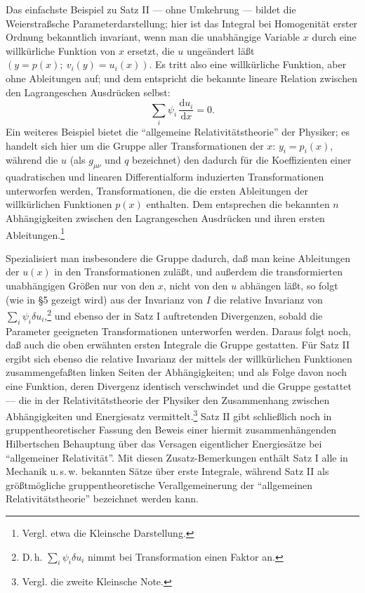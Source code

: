 \documentclass[11pt]{article}
\newcommand{\dd}{\mathrm d}
\begin{document}
Das einfachste Beispiel zu Satz II --- ohne Umkehrung --- bildet die Weierstraßsche Parameterdarstellung; hier ist das Integral bei Homogenität erster Ordnung bekanntlich invariant, wenn man die unabhängige Variable \(x\) durch eine willkürliche Funktion von \(x\) ersetzt, die \(u\) ungeändert läßt \((y=p(x);\ v_i(y)=u_i(x))\). Es tritt also eine willkürliche Funktion, aber ohne Ableitungen auf; und dem entspricht die bekannte lineare Relation zwischen den Lagrangeschen Ausdrücken selbst:
\[
\sum_i \psi_i\,\frac{\dd u_i}{\dd x}=0.
\]
Ein weiteres Beispiel bietet die ``allgemeine Relativitätstheorie'' der Physiker; es handelt sich hier um die Gruppe aller Transformationen der \(x\): \(y_i=p_i(x)\), während die \(u\) (als \(g_{\mu\nu}\) und \(q\) bezeichnet) den dadurch für die Koeffizienten einer quadratischen und linearen Differentialform induzierten Transformationen unterworfen werden, Transformationen, die die ersten Ableitungen der willkürlichen Funktionen \(p(x)\) enthalten. Dem entsprechen die bekannten \(n\) Abhängigkeiten zwischen den Lagrangeschen Ausdrücken und ihren ersten Ableitungen.\footnote{Vergl. etwa die Kleinsche Darstellung.}

Spezialisiert man insbesondere die Gruppe dadurch, daß man keine Ableitungen der \(u(x)\) in den Transformationen zuläßt, und außerdem die transformierten unabhängigen Größen nur von den \(x\), nicht von den \(u\) abhängen läßt, so folgt (wie in \S{}5 gezeigt wird) aus der Invarianz von \(I\) die relative Invarianz von \(\sum_i\psi_i\delta u_i\),\footnote{D.\,h. \(\sum_i\psi_i\delta u_i\) nimmt bei Transformation einen Faktor an.} und ebenso der in Satz I auftretenden Divergenzen, sobald die Parameter geeigneten Transformationen unterworfen werden. Daraus folgt noch, daß auch die oben erwähnten ersten Integrale die Gruppe gestatten. Für Satz II ergibt sich ebenso die relative Invarianz der mittels der willkürlichen Funktionen zusammengefaßten linken Seiten der Abhängigkeiten; und als Folge davon noch eine Funktion, deren Divergenz identisch verschwindet und die Gruppe gestattet --- die in der Relativitätstheorie der Physiker den Zusammenhang zwischen Abhängigkeiten und Energiesatz vermittelt.\footnote{Vergl. die zweite Kleinsche Note.} Satz II gibt schließlich noch in gruppentheoretischer Fassung den Beweis einer hiermit zusammenhängenden Hilbertschen Behauptung über das Versagen eigentlicher Energiesätze bei ``allgemeiner Relativität''. Mit diesen Zusatz-Bemerkungen enthält Satz I alle in Mechanik u.\,s.\,w. bekannten Sätze über erste Integrale, während Satz II als größtmögliche gruppentheoretische Verallgemeinerung der ``allgemeinen Relativitätstheorie'' bezeichnet werden kann.
\end{document}
